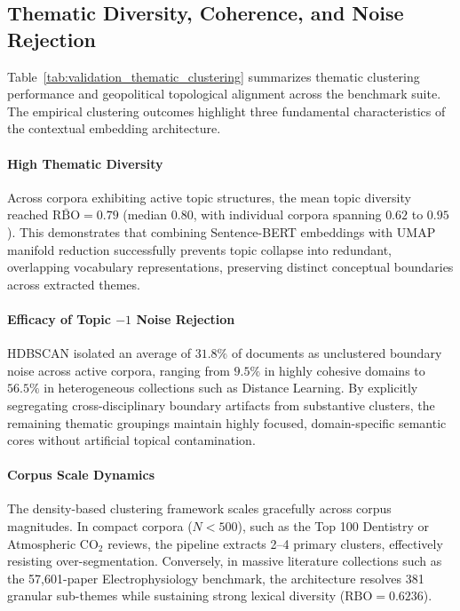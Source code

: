 \documentclass[preprint,12pt]{elsarticle}
\begin{document}


\subsection{Thematic Diversity, Coherence, and Noise Rejection}
Table~\ref{tab:validation_thematic_clustering} summarizes thematic clustering performance and geopolitical topological alignment across the benchmark suite. The empirical clustering outcomes highlight three fundamental characteristics of the contextual embedding architecture.

\paragraph{High Thematic Diversity}
Across corpora exhibiting active topic structures, the mean topic diversity reached $\bar{\text{RBO}} = 0.79$ (median $0.80$, with individual corpora spanning $0.62$ to $0.95$). This demonstrates that combining Sentence-BERT embeddings with UMAP manifold reduction successfully prevents topic collapse into redundant, overlapping vocabulary representations, preserving distinct conceptual boundaries across extracted themes.

\paragraph{Efficacy of Topic $-1$ Noise Rejection}
HDBSCAN isolated an average of $31.8\%$ of documents as unclustered boundary noise across active corpora, ranging from $9.5\%$ in highly cohesive domains to $56.5\%$ in heterogeneous collections such as Distance Learning. By explicitly segregating cross-disciplinary boundary artifacts from substantive clusters, the remaining thematic groupings maintain highly focused, domain-specific semantic cores without artificial topical contamination.

\paragraph{Corpus Scale Dynamics}
The density-based clustering framework scales gracefully across corpus magnitudes. In compact corpora ($N < 500$), such as the Top 100 Dentistry or Atmospheric $\text{CO}_2$ reviews, the pipeline extracts 2--4 primary clusters, effectively resisting over-segmentation. Conversely, in massive literature collections such as the 57,601-paper Electrophysiology benchmark, the architecture resolves 381 granular sub-themes while sustaining strong lexical diversity ($\text{RBO} = 0.6236$).
\end{document}
